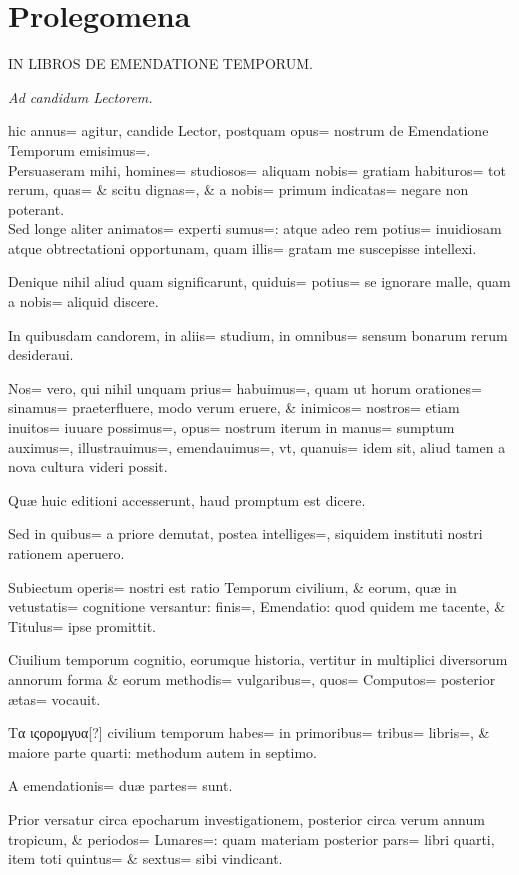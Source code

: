 \chapter{Prolegomena}
\begin{center}
\textsc{IN LIBROS DE EMENDATIONE TEMPORUM.}

\em{Ad candidum Lectorem.}
\end{center}
\begin{parnumbers}
 hic annus= agitur, candide Lector, postquam opus= nostrum de Emendatione Temporum emisimus=.
\\ \p
Persuaseram mihi, homines= studiosos= aliquam nobis= gratiam habituros= tot rerum, quas= \& scitu dignas=, \& a nobis= primum indicatas= negare non poterant.
\\ \p
Sed longe aliter animatos= experti sumus=: atque adeo rem potius= inuidiosam atque obtrectationi opportunam, quam illis= gratam me suscepisse intellexi.

Denique nihil aliud quam significarunt, quiduis= potius= se ignorare malle, quam a nobis= aliquid discere.

In quibusdam candorem, in aliis= studium, in omnibus= sensum bonarum rerum desideraui.

Nos= vero, qui nihil unquam prius= habuimus=, quam ut horum orationes= sinamus= praeterfluere, modo verum eruere, \& inimicos= nostros= etiam inuitos= iuuare possimus=, opus= nostrum iterum in manus= sumptum auximus=, illustrauimus=, emendauimus=, vt, quanuis= idem sit, aliud tamen a nova cultura videri possit.

Quæ huic editioni accesserunt, haud promptum est dicere.

Sed in quibus= a priore demutat, postea intelliges=, siquidem instituti nostri rationem aperuero.

Subiectum operis= nostri est ratio Temporum civilium, \& eorum, quæ in vetustatis= cognitione versantur: finis=, Emendatio: quod quidem me tacente, \& Titulus= ipse promittit.

Ciuilium temporum cognitio, eorumque historia, vertitur in multiplici diversorum annorum forma \& eorum methodis= vulgaribus=, quos= Computos= posterior ætas= vocauit.

Τα ιςορομγυα[?] civilium temporum habes= in primoribus= tribus= libris=, \& maiore parte quarti: methodum autem in septimo.

A emendationis= duæ partes= sunt.

Prior versatur circa epocharum investigationem, posterior circa verum annum tropicum, 
\& periodos= Lunares=: quam materiam posterior pars= libri quarti, item toti quintus= \& sextus= sibi vindicant.


\end{parnumbers}
